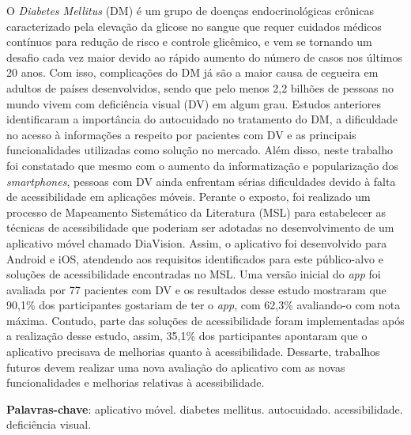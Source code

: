 \setlength{\absparsep}{18pt} %
\begin{resumo}
    O \emph{Diabetes Mellitus} (DM) é um grupo de doenças endocrinológicas crônicas caracterizado pela elevação
    da glicose no sangue que requer cuidados médicos contínuos para redução de risco e controle glicêmico, e vem se
    tornando um desafio cada vez maior devido ao rápido aumento do número de casos nos últimos 20 anos. Com isso,
    complicações do DM já são a maior causa de cegueira em adultos de países desenvolvidos, sendo que pelo menos 2,2
    bilhões de pessoas no mundo vivem com deficiência visual (DV) em algum grau.
    Estudos anteriores identificaram a importância do autocuidado no tratamento do DM, a dificuldade
    no acesso à informações a respeito por pacientes com DV e as principais funcionalidades utilizadas
    como solução no mercado. Além disso, neste trabalho foi constatado que mesmo com o aumento da informatização e
    popularização dos \emph{smartphones}, pessoas com DV ainda enfrentam sérias dificuldades devido à falta
    de acessibilidade em aplicações móveis. Perante o exposto, foi realizado um processo de Mapeamento Sistemático da
    Literatura (MSL) para estabelecer as técnicas de acessibilidade que poderiam ser adotadas no desenvolvimento
    de um aplicativo móvel chamado DiaVision. Assim, o aplicativo foi desenvolvido para Android e iOS, atendendo
    aos requisitos identificados para este público-alvo e soluções de acessibilidade encontradas no MSL\@.
    Uma versão inicial do \emph{app} foi avaliada por 77 pacientes com DV e os resultados desse estudo
    mostraram que 90,1\% dos participantes gostariam de ter o \emph{app}, com 62,3\% avaliando-o com nota máxima.
    Contudo, parte das soluções de acessibilidade foram implementadas após a realização desse estudo, assim,
    35,1\% dos participantes apontaram que o aplicativo precisava de melhorias quanto à acessibilidade. Dessarte,
    trabalhos futuros devem realizar uma nova avaliação do aplicativo com as novas funcionalidades e melhorias
    relativas à acessibilidade.

    \textbf{Palavras-chave}: aplicativo móvel. diabetes mellitus. autocuidado. acessibilidade. deficiência visual.
\end{resumo}